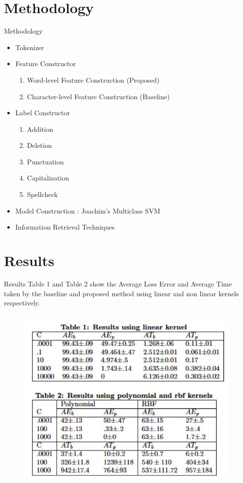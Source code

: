 \documentclass{beamer}
\begin{document}
\section{Methodology}
\begin{frame}{Methodology}
\begin{itemize}
\item<1-> Tokenizer
\item<2-> Feature Constructor
	\begin{enumerate}
	\item Word-level Feature Construction (Proposed)
	\item Character-level Feature Construction (Baseline)
	\end{enumerate}
\item<3-> Label Constructor
	\begin{enumerate}
	\item Addition 
	\item Deletion
	\item Punctuation
	\item Capitalization
	\item Spellcheck
	\end{enumerate}
\item<4-> Model Construction : Joachim's Multiclass SVM
\item<5-> Information Retrieval Techniques

\end{itemize}
\end{frame}

\section{Results}
\begin{frame}{Results}
Table 1 and Table 2 show the Average Loss Error and Average Time taken by the baseline and proposed method using linear and non linear kernels respectively.
\begin{columns}
\begin{figure}[ht]
\begin{center}
\includegraphics[height=2 in]{images/table.jpg}
\end{center}
\end{figure}
\end{columns}
\end{frame}
\end{document}
